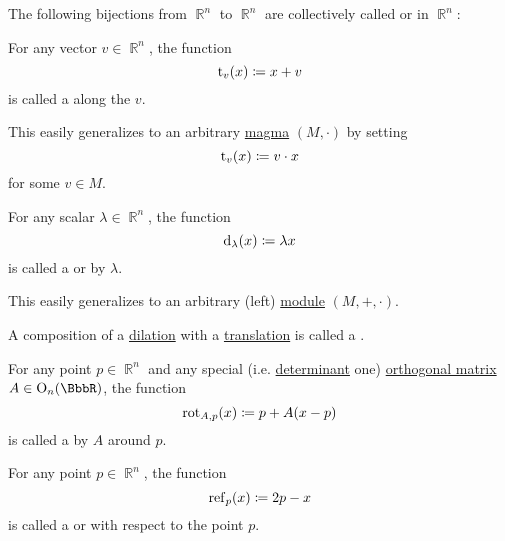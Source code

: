 \begin{definition}\label{def:euclidean_transformation}
  The following bijections from \( \BbbR^n \) to \( \BbbR^n \) are collectively called  or  in \( \BbbR^n \):

  \begin{defenum}
     For any vector \( v \in \BbbR^n \), the function
    \begin{equation*}
      \operatorname{t}_v(x) \coloneqq x + v
    \end{equation*}
    is called a  along the  \( v \).

    This easily generalizes to an arbitrary \hyperref[def:magma]{magma} \( (M, \cdot) \) by setting
    \begin{equation*}
      \operatorname{t}_v(x) \coloneqq v \cdot x
    \end{equation*}
    for some \( v \in M \).

     For any scalar \( \lambda \in \BbbR^n \), the function
    \begin{equation*}
      \operatorname{d}_\lambda(x) \coloneqq \lambda x
    \end{equation*}
    is called a  or  by \( \lambda \).

    This easily generalizes to an arbitrary (left) \hyperref[def:magma]{module} \( (M, +, \cdot) \).

     A composition of a \hyperref[def:euclidean_transformation/dilation]{dilation} with a \hyperref[def:euclidean_transformation/translation]{translation} is called a .

     For any point \( p \in \BbbR^n \) and any special (i.e. \hyperref[def:matrix_determinant]{determinant} one) \hyperref[def:orthogonal_matrix]{orthogonal matrix} \( A \in \op{O}_n(\BbbR) \), the function
    \begin{equation*}
      \operatorname{rot}_{A,p}(x) \coloneqq p + A (x - p)
    \end{equation*}
    is called a  by \( A \) around \( p \).

     For any point \( p \in \BbbR^n \), the function
    \begin{equation*}
      \operatorname{ref}_p(x) \coloneqq 2p - x
    \end{equation*}
    is called a  or  with respect to the point \( p \).
  \end{defenum}
\end{definition}

